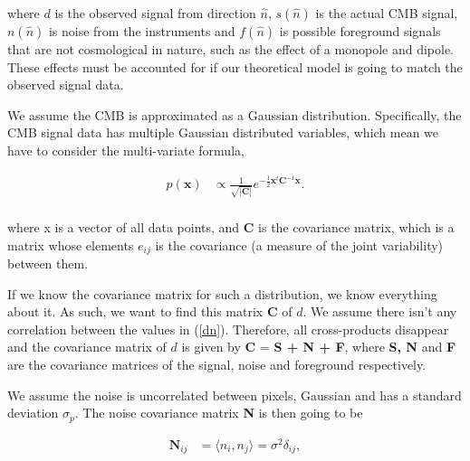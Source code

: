 \documentclass{emulateapj}
\begin{document}
 \noindent
 where $d$ is the observed signal from direction $\hat{n}$, $s(\hat{n})$ is the actual CMB signal, $n(\hat{n})$ is noise from the instruments and $f(\hat{n})$ is possible foreground signals that are not cosmological in nature, such as the effect of a monopole and dipole. These effects must be accounted for if our theoretical model is going to match the observed signal data. 
 
We assume the CMB is approximated as a Gaussian distribution. Specifically, the CMB signal data has multiple Gaussian distributed variables, which mean we have to consider the multi-variate formula, 
 
 \begin{equation}
 \label{gauss}
 \begin{array}{rl}
 p(\textbf{x})  &\propto \frac{1}{\sqrt{|\textbf{C}|}}e^{-\frac{1}{2}\textbf{x}^{t}\textbf{C}^{-1}\textbf{x}}. \\
 \end{array}
 \end{equation}
 
  where x is a vector of all data points, and \textbf{C} is the covariance matrix, which is a matrix whose elements $e_{ij}$ is the covariance (a measure of the joint variability) between them.
  
    
  If we know the covariance matrix for such a distribution, we know everything about it. As such, we want to find this matrix \textbf{C} of $d$. We assume there isn't any correlation between the values in (\ref{dn}). Therefore, all cross-products disappear and the covariance matrix of $d$ is given by \textbf{C} = \textbf{S + N + F}, where \textbf{S, N} and \textbf{F} are the covariance matrices of the signal, noise and foreground respectively.
 
 We assume the noise is uncorrelated between pixels, Gaussian and has a standard deviation $\sigma_p$. The noise covariance matrix \textbf{N} is then going to be
 
  \begin{equation}
  \label{N_cov}
  \begin{array}{rl}
 \textbf{N}_{ij}  &= \langle n_i,n_j \rangle = \sigma^2\delta_{ij}, \\
  \end{array}
  \end{equation}
\end{document}
